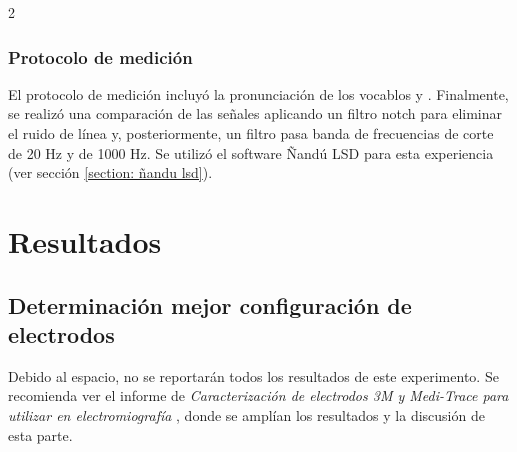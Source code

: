 \documentclass[11pt,letterpaper]{article}
\begin{document}
\begin{multicols*}{2}
\vspace{-6mm}
\subsubsection{Protocolo de medición}

El protocolo de medición incluyó la pronunciación de los vocablos  y . Finalmente, se realizó una comparación de las señales aplicando un filtro notch para eliminar el ruido de línea y, posteriormente, un filtro pasa banda de frecuencias de corte de 20 Hz y de 1000 Hz. Se utilizó el software Ñandú LSD para esta experiencia (ver sección \ref{section: ñandu lsd}).
\vspace{-6mm}
\section{Resultados}
\vspace{-4mm}
\subsection{Determinación mejor configuración de electrodos}

Debido al espacio, no se reportarán todos los resultados de este experimento. Se recomienda ver el informe de \textit{Caracterización de electrodos 3M y Medi-Trace para utilizar en electromiografía} \cite{informeElectrodos2025}, donde se amplían los resultados y la discusión de esta parte.


\end{multicols*}
\end{document}
